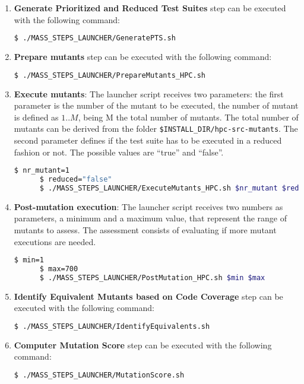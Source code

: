 \begin{enumerate}
	\item \textbf{Generate Prioritized and Reduced Test Suites} step can be executed with the following command:

	\begin{lstlisting}[language=bash]
	  $ ./MASS_STEPS_LAUNCHER/GeneratePTS.sh
\end{lstlisting}

	\item \textbf{Prepare mutants} step can be executed with the following command:

	\begin{lstlisting}[language=bash]
	  $ ./MASS_STEPS_LAUNCHER/PrepareMutants_HPC.sh
\end{lstlisting}

	\item \textbf{Execute mutants}: The launcher script receives two parameters: the first parameter is the number of the mutant to be executed, the number of mutant is defined as ${1..M}$, being M the total number of mutants. The total number of mutants can be derived from the folder \texttt{\$INSTALL\_DIR/hpc-src-mutants}.
	The second parameter defines if the test suite has to be executed in a reduced fashion or not. The possible values are ``true'' and ``false''.

	\begin{lstlisting}[language=bash]
	  $ nr_mutant=1
	  $ reduced="false"
	  $ ./MASS_STEPS_LAUNCHER/ExecuteMutants_HPC.sh $nr_mutant $reduced
\end{lstlisting}

	\item \textbf{Post-mutation execution}: The launcher script receives two numbers as parameters, a minimum and a maximum value, that represent the range of mutants to assess. The assessment consists of evaluating if more mutant executions are needed. 

	\begin{lstlisting}[language=bash]
	  $ min=1
	  $	max=700
	  $ ./MASS_STEPS_LAUNCHER/PostMutation_HPC.sh $min $max
\end{lstlisting}

	\item \textbf{Identify Equivalent Mutants based on Code Coverage} step can be executed with the following command:

	\begin{lstlisting}[language=bash]
	  $ ./MASS_STEPS_LAUNCHER/IdentifyEquivalents.sh
\end{lstlisting}

	\item \textbf{Computer Mutation Score} step can be executed with the following command:

	\begin{lstlisting}[language=bash]
	  $ ./MASS_STEPS_LAUNCHER/MutationScore.sh
\end{lstlisting} 
\end{enumerate}

